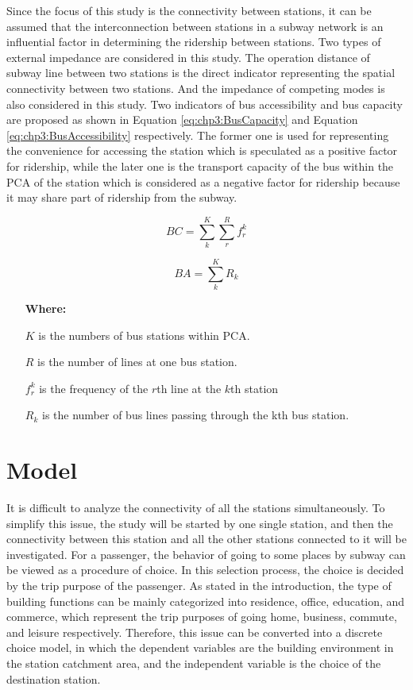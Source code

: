 %
Since the focus of this study is the connectivity between stations, it can be assumed that the interconnection between stations in a subway network is an influential factor in determining the ridership between stations. Two types of external impedance are considered in this study. The operation distance of subway line between two stations is the direct indicator representing the spatial connectivity between two stations. And the impedance of competing modes is also considered in this study. Two indicators of bus accessibility and bus capacity are proposed as shown in Equation \ref{eq:chp3:BusCapacity} and Equation \ref{eq:chp3:BusAccessibility} respectively. The former one is used for representing the convenience for accessing the station which is speculated as a positive factor for ridership, while the later one is the transport capacity of the bus within the PCA of the station which is considered as a negative factor for ridership because it may share part of ridership from the subway.

\begin{equation}
	BC=\sum_{k}^{K}\sum_{r}^{R}f_{r}^{k}
	\label{eq:chp3:BusCapacity}
\end{equation}

\begin{equation}
	BA=\sum_{k}^{K}R_{k}
	\label{eq:chp3:BusAccessibility}
\end{equation}

\begin{enumerate}
	\item[\textbf{Where:}]
	\item[$K$] is the numbers of bus stations within PCA.
	\item[$R$] is the number of lines at one bus station.
	\item[$f_{r}^{k}$] is the frequency of the $r$th line at the $k$th station
	\item[$R_k$] is the number of bus lines passing through the kth bus station.
\end{enumerate}

%
\section{Model}
%
It is difficult to analyze the connectivity of all the stations simultaneously. To simplify this issue, the study will be started by one single station, and then the connectivity between this station and all the other stations connected to it will be investigated. For a passenger, the behavior of going to some places by subway can be viewed as a procedure of choice. In this selection process, the choice is decided by the trip purpose of the passenger. As stated in the introduction, the type of building functions can be mainly categorized into residence, office, education, and commerce, which represent the trip purposes of going home, business, commute, and leisure respectively. Therefore, this issue can be converted into a discrete choice model, in which the dependent variables are the building environment in the station catchment area, and the independent variable is the choice of the destination station.

